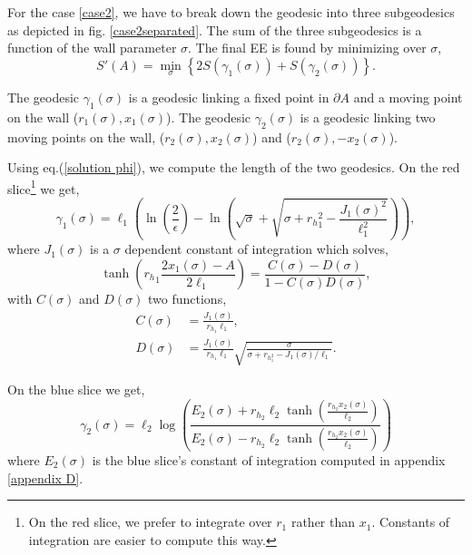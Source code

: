 For the case \ref{case2}, we have to break down the geodesic into three subgeodesics as depicted in fig. \ref{case2separated}. The sum of the three subgeodesics is a function of the wall parameter $\sigma$. The final EE is found by minimizing over $\sigma$,
\begin{equation}\label{second entropy}
    S'\left(A\right) = \min_\sigma\left\{2S\left(\gamma_1(\sigma)\right)+S\left(\gamma_2(\sigma)\right)\right\}.
\end{equation}

The geodesic $\gamma_1(\sigma)$ is a geodesic linking a fixed point in $\partial A$ and a moving point on the wall ($r_1(\sigma),x_1(\sigma)$). The geodesic $\gamma_2(\sigma)$ is a geodesic linking two moving points on the wall, ($r_2(\sigma),x_2(\sigma)$) and ($r_2(\sigma),-x_2(\sigma)$).

Using eq.(\ref{solution phi}), we compute the length of the two geodesics. On the red slice\footnote{On the red slice, we prefer to integrate over $r_1$ rather than $x_1$. Constants of integration are easier to compute this way.} we get,
\begin{equation}
    \gamma_1(\sigma)=\ell_1\left(\ln\left(\frac{2}{\epsilon}\right)-\ln\left(\sqrt{\sigma}+\sqrt{\sigma+{r_h}_1^2-\frac{J_1(\sigma)^2}{\ell_1^2}}\right)\right),
\end{equation}
where $J_1(\sigma)$ is a $\sigma$ dependent constant of integration which solves,
\begin{equation}\label{maconstante}
    \tanh \left( {r_h}_1 \frac{2x_1(\sigma) - A}{2\ell_1}\right) = \frac{C(\sigma)-D(\sigma)}{1-C(\sigma)D(\sigma)},
\end{equation}
with $C(\sigma)$ and $D(\sigma)$ two functions,
\begin{align}\label{CD}
    C(\sigma) &= \frac{J_1(\sigma)}{r_{h_1}\ell_1}, \\
    D(\sigma) &= \frac{J_1(\sigma)}{r_{h_1}\ell_1}\sqrt{\frac{\sigma}{\sigma+r_h_1^2-J_1(\sigma)/\ell_1}}.
\end{align}

On the blue slice we get,
\begin{equation}
    \gamma_2(\sigma)=\ell_2\log\left(\frac{E_2(\sigma)+r_h_2\ell_2\tanh\left(\frac{r_h_2x_2(\sigma)}{\ell_2}\right)}{E_2(\sigma)-r_h_2\ell_2\tanh\left(\frac{r_h_2x_2(\sigma)}{\ell_2}\right)}\right)
\end{equation}
where $E_2(\sigma)$ is the blue slice's constant of integration computed in appendix \ref{appendix D}.

